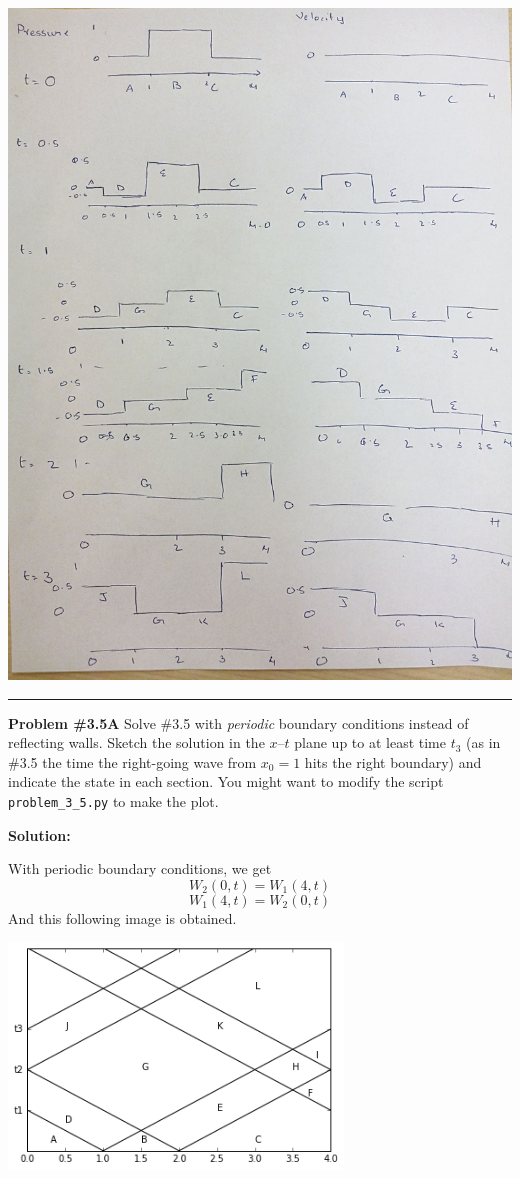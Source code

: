 \documentclass[11pt]{article}
\begin{document}
\hfil\includegraphics[width=6in]{1}\hfil

\vskip 1cm
\hrule
{\bf Problem \#3.5A}
Solve \#3.5 with {\em periodic} boundary conditions instead of reflecting
walls.  Sketch the solution in the $x$--$t$ plane
up to at least time $t_3$ (as in \#3.5 the time
the right-going wave from $x_0=1$ hits the right boundary) 
and indicate the state in each section.  You might want to modify the
script \verb+problem_3_5.py+ to make the plot.


\vskip 1cm
{\bf Solution:}

With periodic boundary conditions, we get
\[ W_2(0,t)= W_1(4,t)\]
\[ W_1(4,t)= W_2(0,t)\]
And this following image is obtained.

\hfil\includegraphics[width=3.5in]{BOUND.png}\hfil
\end{document}
